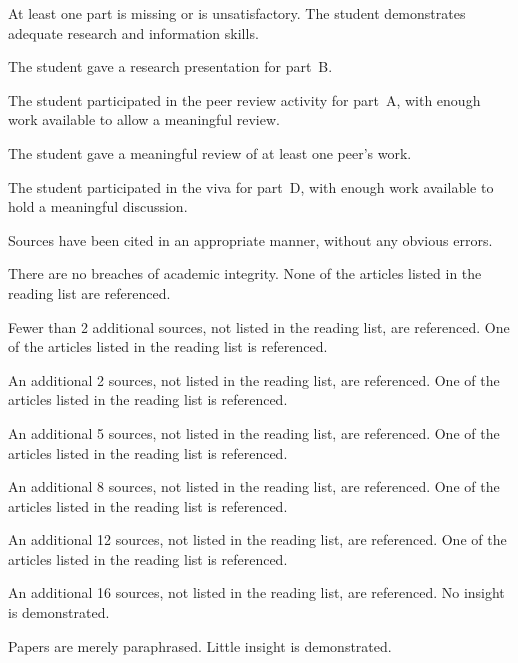 \documentclass{../../fal_assignment}
\begin{document}
\begin{markingrubric}
%
		\grade\fail At least one part is missing or is unsatisfactory.
		\grade The student demonstrates adequate research and information skills.
			\par The student gave a research presentation for part~B.
		    \par The student participated in the peer review activity for part~A,
			with enough work available to allow a meaningful review.
			\par The student gave a meaningful review of at least one peer's work.
			\par The student participated in the viva for part~D, with enough work available to hold a meaningful discussion.
			\par Sources have been cited in an appropriate manner, without any obvious errors.
			\par There are no breaches of academic integrity.
%
        \grade\fail	None of the articles listed in the reading list are referenced.
        \par		Fewer than 2 additional sources, not listed in the reading list, are referenced.
        \grade		One of the articles listed in the reading list is referenced.
        \par		An additional 2 sources, not listed in the reading list, are referenced.
        \grade		One of the articles listed in the reading list is referenced.
        \par		An additional 5 sources, not listed in the reading list, are referenced.
        \grade		One of the articles listed in the reading list is referenced.
        \par		An additional 8 sources, not listed in the reading list, are referenced.
        \grade		One of the articles listed in the reading list is referenced.
        \par		An additional 12 sources, not listed in the reading list, are referenced.
        \grade		One of the articles listed in the reading list is referenced.
        \par		An additional 16 sources, not listed in the reading list, are referenced.
%
        \grade\fail No insight is demonstrated.
        \par		Papers are merely paraphrased.
        \grade		Little insight is demonstrated.

\end{markingrubric}
\end{document}
